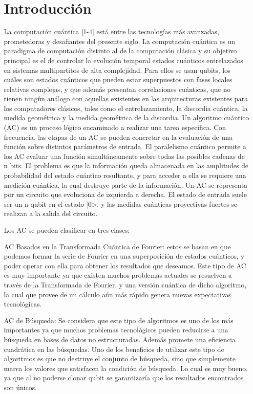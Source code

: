 \chapter{Introducci\'on}

La computación cuántica [1-4] está entre las tecnologías más avanzadas, prometedoras y desafiantes del presente siglo. La computación cuántica es un paradigma de computación distinto al de la computación clásica y su objetivo principal es el de controlar la evolución temporal estados cuánticos entrelazados en sistemas multipartitos de alta complejidad. Para ellos se usan qubits, los cuáles son estados cuánticos que pueden estar superpuestos con fases locales relativas complejas, y que además presentan correlaciones cuánticas, que no tienen ningún análogo con aquellas existentes en las arquitecturas existentes para los computadores clásicos, tales como el entrelazamiento, la discordia cuántica, la medida geométrica y la medida geométrica de la discordia.  Un algoritmo cuántico (AC) es un proceso lógico encaminado a realizar una tarea específica. Con frecuencia, las etapas de un AC se pueden concretar en la evaluación de una función sobre distintos parámetros de entrada. El paralelismo cuántico permite a los AC evaluar una función simultáneamente sobre todas las posibles cadenas de n bits. El problema es que la información queda almacenada en las amplitudes de probabilidad del estado cuántico resultante, y para acceder a ella se requiere una medición cuántica, la cual destruye parte de la información. Un AC se representa por un circuito que evoluciona de izquierda a derecha. El estado de entrada suele ser un n-qubit en el estado |0>, y las medidas cuánticas proyectivas fuertes se realizan a la salida del circuito.

Los AC se pueden clasificar en tres clases:

AC Basados en la Transformada Cuántica de Fourier: estos se basan en que podemos formar la serie de Fourier en una superposición de estados cuánticos, y poder operar con ella para obtener los resultados que deseamos. Este tipo de AC es muy importante ya que existen muchos problemas actuales se resuelven a través de la Transformada de Fourier, y una versión cuántica de dicho algoritmo, la cual que provee de un cálculo aún más rápido genera nuevas expectativas tecnológicas.

AC de Búsqueda: Se considera que este tipo de algoritmos es uno de los más importantes ya que muchos problemas tecnológicos pueden reducirse a una búsqueda en bases de datos no estructuradas. Además promete una eficiencia cuadrática en las búsquedas. Uno de los beneficios de utilizar este tipo de algoritmos es que no destruye el conjunto de búsqueda, sino que simplemente marca los valores que satisfacen la condición de búsqueda. Lo cual es muy bueno, ya que al no poderse clonar qubit se garantizaría que los resultados encontrados son únicos.

